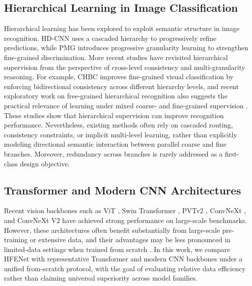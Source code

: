 \documentclass[pdflatex,iicol,sn-mathphys-num]{sn-jnl}
\theoremstyle{thmstyleone}%
\theoremstyle{thmstyletwo}%
\theoremstyle{thmstylethree}%
\begin{document}
\subsection{Hierarchical Learning in Image Classification}
Hierarchical learning has been explored to exploit semantic structure in image recognition. 
HD-CNN \cite{yan2015hdcnn} uses a cascaded hierarchy to progressively refine predictions, while PMG \cite{du2020fine} introduces progressive granularity learning to strengthen fine-grained discrimination. 
More recent studies have revisited hierarchical supervision from the perspective of cross-level consistency and multi-granularity reasoning. 
For example, CHBC \cite{gao2025chbc} improves fine-grained visual classification by enforcing bidirectional consistency across different hierarchy levels, and recent exploratory work on free-grained hierarchical recognition also suggests the practical relevance of learning under mixed coarse- and fine-grained supervision \cite{park2025freegrained}. 
These studies show that hierarchical supervision can improve recognition performance. 
Nevertheless, existing methods often rely on cascaded routing, consistency constraints, or implicit multi-level learning, rather than explicitly modeling directional semantic interaction between parallel coarse and fine branches. 
Moreover, redundancy across branches is rarely addressed as a first-class design objective.

\subsection{Transformer and Modern CNN Architectures}
Recent vision backbones such as ViT \cite{dosovitskiy2020image}, Swin Transformer \cite{liu2021swin}, PVTv2 \cite{wang2022pvt}, ConvNeXt \cite{liu2022convnext}, and ConvNeXt V2 \cite{woo2023convnextv2} have achieved strong performance on large-scale benchmarks. 
However, these architectures often benefit substantially from large-scale pre-training or extensive data, and their advantages may be less pronounced in limited-data settings when trained from scratch \cite{touvron2021training}.
In this work, we compare HFENet with representative Transformer and modern CNN backbones under a unified from-scratch protocol, with the goal of evaluating relative data efficiency rather than claiming universal superiority across model families.
\end{document}
